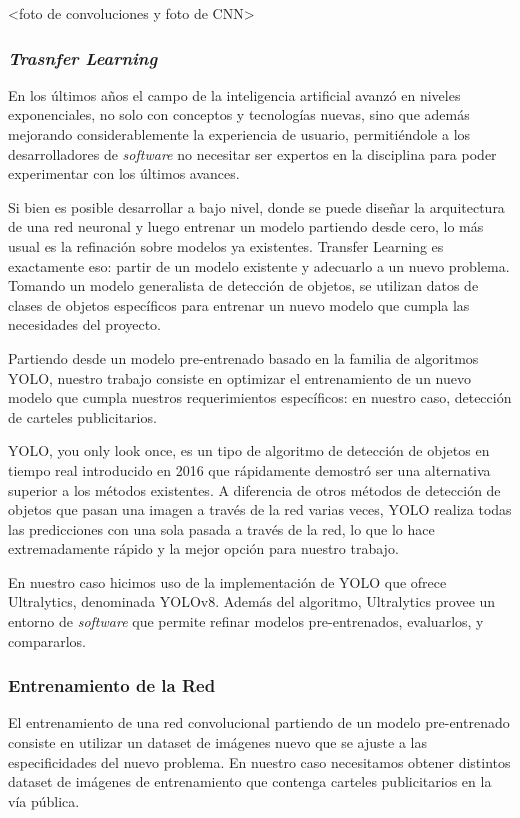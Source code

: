 \documentclass[a4paper]{article}
\begin{document}
<foto de convoluciones y foto de CNN>

\subsubsection{\textit{Trasnfer Learning}}

En los últimos años el campo de la inteligencia artificial avanzó en niveles exponenciales, no solo con conceptos y tecnologías nuevas, sino que además mejorando considerablemente la experiencia de usuario, permitiéndole a los desarrolladores de \textit{software} no necesitar ser expertos en la disciplina para poder experimentar con los últimos avances.

Si bien es posible desarrollar a bajo nivel, donde se puede diseñar la arquitectura de una red neuronal y luego entrenar un modelo partiendo desde cero, lo más usual es la refinación sobre modelos ya existentes. Transfer Learning es exactamente eso: partir de un modelo existente y adecuarlo a un nuevo problema. Tomando un modelo generalista de detección de objetos, se utilizan datos de clases de objetos específicos para entrenar un nuevo modelo que cumpla las necesidades del proyecto.

Partiendo desde un modelo pre-entrenado basado en la familia de algoritmos YOLO, nuestro trabajo consiste en optimizar el entrenamiento de un nuevo modelo que cumpla nuestros requerimientos específicos: en nuestro caso, detección de carteles publicitarios.

YOLO, you only look once, es un tipo de algoritmo de detección de objetos en tiempo real introducido en 2016 que rápidamente demostró ser una alternativa superior a los métodos existentes. A diferencia de otros métodos de detección de objetos que pasan una imagen a través de la red varias veces, YOLO realiza todas las predicciones con una sola pasada a través de la red, lo que lo hace extremadamente rápido y la mejor opción para nuestro trabajo.

En nuestro caso hicimos uso de la implementación de YOLO que ofrece Ultralytics, denominada YOLOv8. Además del algoritmo, Ultralytics provee un entorno de \textit{software} que permite refinar modelos pre-entrenados, evaluarlos, y compararlos.

\subsubsection{Entrenamiento de la Red}

El entrenamiento de una red convolucional partiendo de un modelo pre-entrenado consiste en utilizar un dataset de imágenes nuevo que se ajuste a las especificidades del nuevo problema. En nuestro caso necesitamos obtener distintos dataset de imágenes de entrenamiento que contenga carteles publicitarios en la vía pública.
\end{document}
